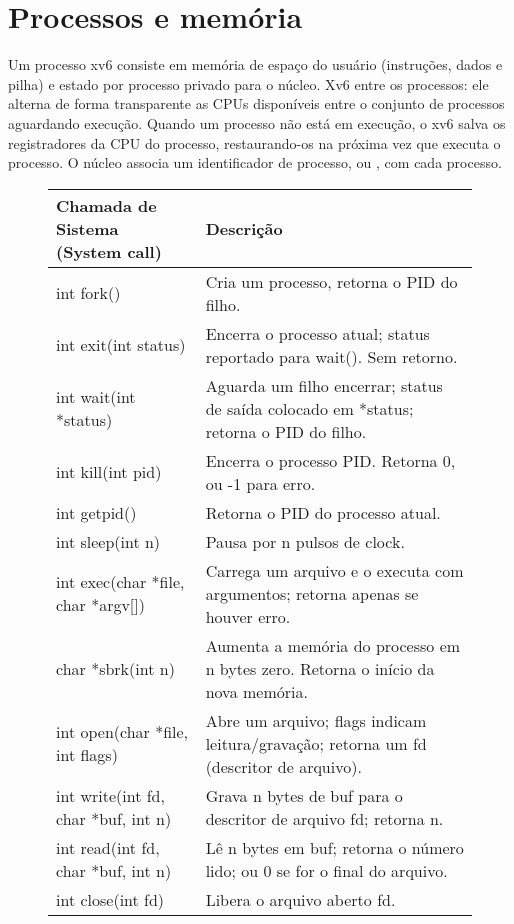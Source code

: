 \section{Processos e memória}

Um processo xv6 consiste em memória de espaço do usuário (instruções, dados e pilha)
e estado por processo privado para o núcleo.
Xv6  entre os processos: ele alterna de forma transparente as CPUs disponíveis
entre o conjunto de processos aguardando execução.
Quando um processo não está em execução, o xv6 salva os registradores da CPU do processo,
restaurando-os na próxima vez que executa o processo.
O núcleo associa um identificador de processo, ou
,
com cada processo.

\begin{figure}[H]
\center
\small
\begin{tabular}{p{4cm} p{10cm}} %
{\bf Chamada de Sistema (System call)} & {\bf Descrição} \\
\midrule
int fork() & Cria um processo, retorna o PID do filho. \\
int exit(int status) & Encerra o processo atual; status reportado para wait(). Sem retorno. \\
int wait(int *status) & Aguarda um filho encerrar; status de saída colocado em *status; retorna o PID do filho. \\
int kill(int pid) & Encerra o processo PID. Retorna 0, ou -1 para erro. \\
int getpid() & Retorna o PID do processo atual. \\
int sleep(int n) & Pausa por n pulsos de clock. \\
int exec(char *file, char *argv[]) & Carrega um arquivo e o executa com argumentos; retorna apenas se houver erro. \\
char *sbrk(int n) & Aumenta a memória do processo em n bytes zero. Retorna o início da nova memória. \\
int open(char *file, int flags) & Abre um arquivo; flags indicam leitura/gravação; retorna um fd (descritor de arquivo). \\
int write(int fd, char *buf, int n) & Grava n bytes de buf para o descritor de arquivo fd; retorna n. \\
int read(int fd, char *buf, int n) & Lê n bytes em buf; retorna o número lido; ou 0 se for o final do arquivo. \\
int close(int fd) & Libera o arquivo aberto fd. \\

\end{tabular}
\end{figure}
